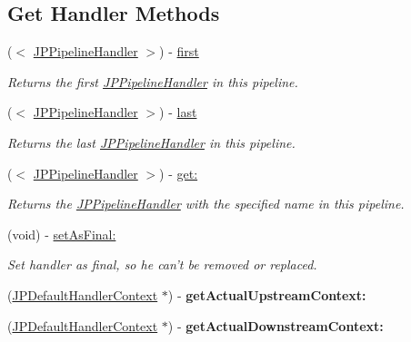 \subsection*{Get Handler Methods}
\begin{DoxyCompactItemize}
\item 
($<$ \hyperlink{a00029}{JPPipelineHandler} $>$) -\/ \hyperlink{a00019_ab61ee133cd37d7b7ea31664a50f90beb}{first}
\begin{DoxyCompactList}\small\item\em Returns the first \hyperlink{a00029}{JPPipelineHandler} in this pipeline. \item\end{DoxyCompactList}\item 
($<$ \hyperlink{a00029}{JPPipelineHandler} $>$) -\/ \hyperlink{a00019_a8b3571a4e858f1b4a5ac659f5353a6ff}{last}
\begin{DoxyCompactList}\small\item\em Returns the last \hyperlink{a00029}{JPPipelineHandler} in this pipeline. \item\end{DoxyCompactList}\item 
($<$ \hyperlink{a00029}{JPPipelineHandler} $>$) -\/ \hyperlink{a00019_a08dc74fe2d73596ecda94f10ed3989f2}{get:}
\begin{DoxyCompactList}\small\item\em Returns the \hyperlink{a00029}{JPPipelineHandler} with the specified name in this pipeline. \item\end{DoxyCompactList}\item 
(void) -\/ \hyperlink{a00019_ad50160ab12c1c622a29d70fce1a58496}{setAsFinal:}
\begin{DoxyCompactList}\small\item\em Set handler as final, so he can't be removed or replaced. \item\end{DoxyCompactList}\item 
\hypertarget{a00019_a935af33ba729edcfe3781c6287ed3038}{
(\hyperlink{a00011}{JPDefaultHandlerContext} $\ast$) -\/ {\bfseries getActualUpstreamContext:}}
\label{a00019_a935af33ba729edcfe3781c6287ed3038}

\item 
\hypertarget{a00019_a02f42359af0eb3069c19768edd21731f}{
(\hyperlink{a00011}{JPDefaultHandlerContext} $\ast$) -\/ {\bfseries getActualDownstreamContext:}}
\label{a00019_a02f42359af0eb3069c19768edd21731f}

\end{DoxyCompactItemize}
